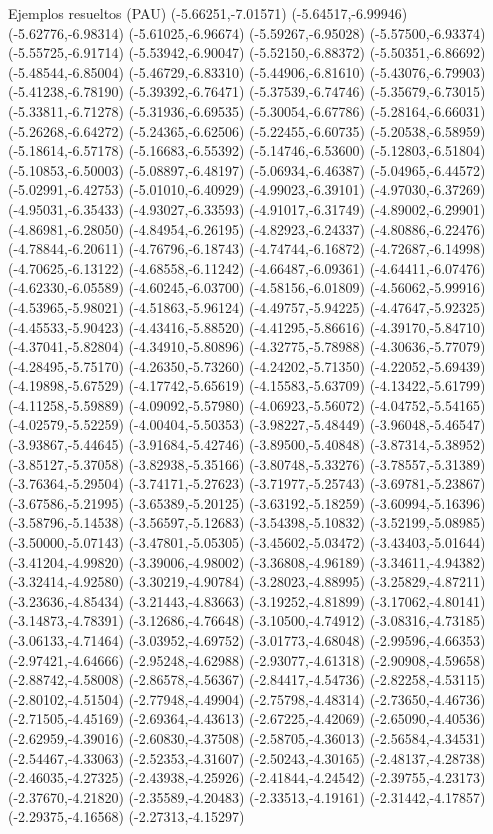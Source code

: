 \documentclass[11pt,a4paper]{article}
\begin{document}
\begin{fmex}{Ejemplos resueltos (PAU)}
(-5.66251,-7.01571) (-5.64517,-6.99946) (-5.62776,-6.98314) (-5.61025,-6.96674) (-5.59267,-6.95028) (-5.57500,-6.93374) (-5.55725,-6.91714) (-5.53942,-6.90047) (-5.52150,-6.88372) (-5.50351,-6.86692) (-5.48544,-6.85004) (-5.46729,-6.83310) (-5.44906,-6.81610) (-5.43076,-6.79903) (-5.41238,-6.78190) (-5.39392,-6.76471) (-5.37539,-6.74746) (-5.35679,-6.73015) (-5.33811,-6.71278) (-5.31936,-6.69535) (-5.30054,-6.67786) (-5.28164,-6.66031) (-5.26268,-6.64272) (-5.24365,-6.62506) (-5.22455,-6.60735) (-5.20538,-6.58959) (-5.18614,-6.57178) (-5.16683,-6.55392) (-5.14746,-6.53600) (-5.12803,-6.51804) (-5.10853,-6.50003) (-5.08897,-6.48197) (-5.06934,-6.46387) (-5.04965,-6.44572) (-5.02991,-6.42753) (-5.01010,-6.40929) (-4.99023,-6.39101) (-4.97030,-6.37269) (-4.95031,-6.35433) (-4.93027,-6.33593) (-4.91017,-6.31749) (-4.89002,-6.29901) (-4.86981,-6.28050) (-4.84954,-6.26195) (-4.82923,-6.24337) (-4.80886,-6.22476) (-4.78844,-6.20611) (-4.76796,-6.18743) (-4.74744,-6.16872) (-4.72687,-6.14998) (-4.70625,-6.13122) (-4.68558,-6.11242) (-4.66487,-6.09361) (-4.64411,-6.07476) (-4.62330,-6.05589) (-4.60245,-6.03700) (-4.58156,-6.01809) (-4.56062,-5.99916) (-4.53965,-5.98021) (-4.51863,-5.96124) (-4.49757,-5.94225) (-4.47647,-5.92325) (-4.45533,-5.90423) (-4.43416,-5.88520) (-4.41295,-5.86616) (-4.39170,-5.84710) (-4.37041,-5.82804) (-4.34910,-5.80896) (-4.32775,-5.78988) (-4.30636,-5.77079) (-4.28495,-5.75170) (-4.26350,-5.73260) (-4.24202,-5.71350) (-4.22052,-5.69439) (-4.19898,-5.67529) (-4.17742,-5.65619) (-4.15583,-5.63709) (-4.13422,-5.61799) (-4.11258,-5.59889) (-4.09092,-5.57980) (-4.06923,-5.56072) (-4.04752,-5.54165) (-4.02579,-5.52259) (-4.00404,-5.50353) (-3.98227,-5.48449) (-3.96048,-5.46547) (-3.93867,-5.44645) (-3.91684,-5.42746) (-3.89500,-5.40848) (-3.87314,-5.38952) (-3.85127,-5.37058) (-3.82938,-5.35166) (-3.80748,-5.33276) (-3.78557,-5.31389) (-3.76364,-5.29504) (-3.74171,-5.27623) (-3.71977,-5.25743) (-3.69781,-5.23867) (-3.67586,-5.21995) (-3.65389,-5.20125) (-3.63192,-5.18259) (-3.60994,-5.16396) (-3.58796,-5.14538) (-3.56597,-5.12683) (-3.54398,-5.10832) (-3.52199,-5.08985) (-3.50000,-5.07143) (-3.47801,-5.05305) (-3.45602,-5.03472) (-3.43403,-5.01644) (-3.41204,-4.99820) (-3.39006,-4.98002) (-3.36808,-4.96189) (-3.34611,-4.94382) (-3.32414,-4.92580) (-3.30219,-4.90784) (-3.28023,-4.88995) (-3.25829,-4.87211) (-3.23636,-4.85434) (-3.21443,-4.83663) (-3.19252,-4.81899) (-3.17062,-4.80141) (-3.14873,-4.78391) (-3.12686,-4.76648) (-3.10500,-4.74912) (-3.08316,-4.73185) (-3.06133,-4.71464) (-3.03952,-4.69752) (-3.01773,-4.68048) (-2.99596,-4.66353) (-2.97421,-4.64666) (-2.95248,-4.62988) (-2.93077,-4.61318) (-2.90908,-4.59658) (-2.88742,-4.58008) (-2.86578,-4.56367) (-2.84417,-4.54736) (-2.82258,-4.53115) (-2.80102,-4.51504) (-2.77948,-4.49904) (-2.75798,-4.48314) (-2.73650,-4.46736) (-2.71505,-4.45169) (-2.69364,-4.43613) (-2.67225,-4.42069) (-2.65090,-4.40536) (-2.62959,-4.39016) (-2.60830,-4.37508) (-2.58705,-4.36013) (-2.56584,-4.34531) (-2.54467,-4.33063) (-2.52353,-4.31607) (-2.50243,-4.30165) (-2.48137,-4.28738) (-2.46035,-4.27325) (-2.43938,-4.25926) (-2.41844,-4.24542) (-2.39755,-4.23173) (-2.37670,-4.21820) (-2.35589,-4.20483) (-2.33513,-4.19161) (-2.31442,-4.17857) (-2.29375,-4.16568) (-2.27313,-4.15297) 
\end{fmex}
\end{document}
